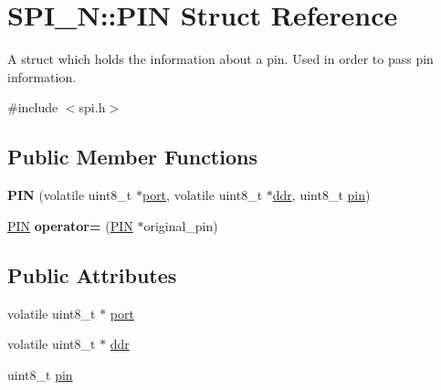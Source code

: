 \hypertarget{struct_s_p_i___n_1_1_p_i_n}{}\section{S\+P\+I\+\_\+N\+:\+:P\+IN Struct Reference}
\label{struct_s_p_i___n_1_1_p_i_n}


A struct which holds the information about a pin. Used in order to pass pin information.  




{\ttfamily \#include $<$spi.\+h$>$}

\subsection*{Public Member Functions}
\begin{DoxyCompactItemize}
\item 
\hypertarget{struct_s_p_i___n_1_1_p_i_n_a2e2dd3ca9d97fb7e08ded7ec014a936c}{}\label{struct_s_p_i___n_1_1_p_i_n_a2e2dd3ca9d97fb7e08ded7ec014a936c} 
{\bfseries P\+IN} (volatile uint8\+\_\+t $\ast$\hyperlink{struct_s_p_i___n_1_1_p_i_n_ae1d5f750e364d99dfa888bf2042fa6c2}{port}, volatile uint8\+\_\+t $\ast$\hyperlink{struct_s_p_i___n_1_1_p_i_n_a6ccc89a50bb2562bacdd839edd2442c5}{ddr}, uint8\+\_\+t \hyperlink{struct_s_p_i___n_1_1_p_i_n_abb2cb9d43e5af9fe7d59df75aca39b0b}{pin})
\item 
\hypertarget{struct_s_p_i___n_1_1_p_i_n_aa6478611d9f9ac35f8aa28444ba9d996}{}\label{struct_s_p_i___n_1_1_p_i_n_aa6478611d9f9ac35f8aa28444ba9d996} 
\hyperlink{struct_s_p_i___n_1_1_p_i_n}{P\+IN} {\bfseries operator=} (\hyperlink{struct_s_p_i___n_1_1_p_i_n}{P\+IN} $\ast$original\+\_\+pin)
\end{DoxyCompactItemize}
\subsection*{Public Attributes}
\begin{DoxyCompactItemize}
\item 
volatile uint8\+\_\+t $\ast$ \hyperlink{struct_s_p_i___n_1_1_p_i_n_ae1d5f750e364d99dfa888bf2042fa6c2}{port}
\item 
volatile uint8\+\_\+t $\ast$ \hyperlink{struct_s_p_i___n_1_1_p_i_n_a6ccc89a50bb2562bacdd839edd2442c5}{ddr}
\item 
uint8\+\_\+t \hyperlink{struct_s_p_i___n_1_1_p_i_n_abb2cb9d43e5af9fe7d59df75aca39b0b}{pin}
\end{DoxyCompactItemize}


